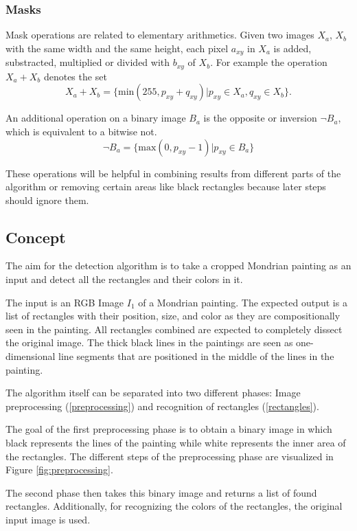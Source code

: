 \documentclass[serif,article,noparskip]{agse-thesis}
\begin{document}
\subsubsection{Masks}

Mask operations are related to elementary arithmetics. Given two images $X_a$,
$X_b$ with the same width and the same height, each pixel $a_{xy}$ in $X_a$ is
added, substracted, multiplied or divided with $b_{xy}$ of $X_b$. For example
the operation $X_a + X_b$ denotes the set $$X_a + X_b = \{\mathrm{min}(255,
p_{xy} + q_{xy}) | p_{xy} \in X_a, q_{xy} \in X_b\}.$$

An additional operation on a binary image $B_a$ is the opposite or inversion
$\neg B_a$, which is equivalent to a bitwise not.
$$\neg B_a = \{\mathrm{max}(0,p_{xy} - 1) | p_{xy} \in B_a\}$$

These operations will be helpful in combining results from different parts of
the algorithm or removing certain areas like black rectangles because later
steps should ignore them.

\subsection{Concept} \label{concept}

The aim for the detection algorithm is to take a cropped Mondrian painting as
an input and detect all the rectangles and their colors in it.

The input is an RGB Image $I_1$ of a Mondrian painting. The expected output is a
list of rectangles with their position, size, and color as they are
compositionally seen in the painting. All rectangles combined are expected to
completely dissect the original image. The thick black lines in the paintings are
seen as one-dimensional line segments that are positioned in the middle of the
lines in the painting.

The algorithm itself can be separated into two different phases: Image
preprocessing (\ref{preprocessing}) and recognition of rectangles (\ref{rectangles}).

The goal of the first preprocessing phase is to obtain a binary image in which
black represents the lines of the painting while white represents the inner area
of the rectangles. The different steps of the preprocessing phase are visualized
in Figure \ref{fig:preprocessing}.

The second phase then takes this binary image and returns a list of found
rectangles. Additionally, for recognizing the colors of the rectangles, the
original input image is used.
\end{document}
